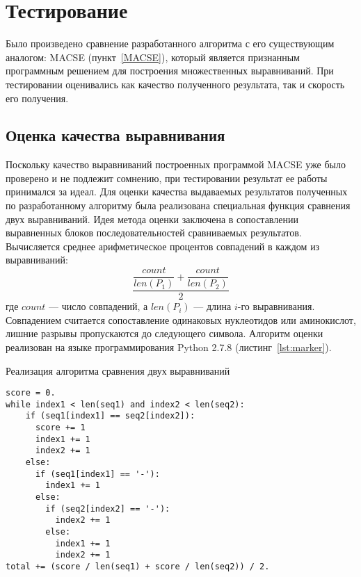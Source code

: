 \clearpage
\newpage

\section[Тестирование]{\large \centering Тестирование}
\hspace{\parindent} Было произведено сравнение разработанного алгоритма с его существующим аналогом: MACSE (пункт~\ref{MACSE}), который является признанным программным решением для построения множественных выравниваний. При тестировании оценивались как качество полученного результата, так и скорость его получения.

\subsection[Оценка качества выравнивания]{\large Оценка качества выравнивания}
\hspace{\parindent} Поскольку качество выравниваний построенных программой MACSE уже было проверено и не подлежит сомнению, при тестировании результат ее работы принимался за идеал. Для оценки качества выдаваемых результатов полученных по разработанному алгоритму была реализована специальная функция сравнения двух выравниваний. Идея метода оценки заключена в сопоставлении выравненных блоков последовательностей сравниваемых результатов. Вычисляется среднее арифметическое процентов совпадений в каждом из выравниваний:
\begin{equation*}
\dfrac{\dfrac{count}{len(P_1)} + \dfrac{count}{len(P_2)}}{2}
\end{equation*}
где $count$ --- число совпадений, а $len(P_i)$ --- длина $i$-го выравнивания. Совпадением считается сопоставление одинаковых нуклеотидов или аминокислот, лишние разрывы пропускаются до следующего символа. Алгоритм оценки реализован на языке программирования Python 2.7.8 (листинг~\ref{lst:marker}).
\begin{algorithm}
	\caption{Реализация алгоритма сравнения двух выравниваний} \label{lst:marker}
	\begin{lstlisting}
score = 0.
while index1 < len(seq1) and index2 < len(seq2):
    if (seq1[index1] == seq2[index2]):
      score += 1
      index1 += 1
      index2 += 1
    else:
      if (seq1[index1] == '-'):
        index1 += 1
      else:
        if (seq2[index2] == '-'):
          index2 += 1
        else:
          index1 += 1
          index2 += 1
total += (score / len(seq1) + score / len(seq2)) / 2.
	\end{lstlisting}
\end{algorithm}
